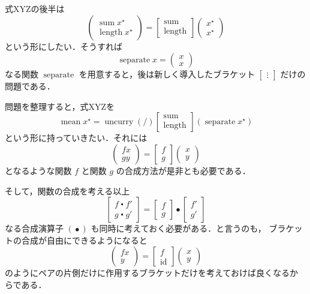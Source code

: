 \documentclass[a5paper,twoside,fleqn,draft]{jsbook}
\newcommand{\mSpecialFunc}[1]{#1}
\DeclareMathOperator{\mId}{\mSpecialFunc{id}}
\DeclareMathOperator{\mLength}{\mSpecialFunc{length}}
\DeclareMathOperator{\mMean}{\mSpecialFunc{mean}}
\DeclareMathOperator{\mSeparate}{\mSpecialFunc{separate}}
\DeclareMathOperator{\mSum}{\mSpecialFunc{sum}}
\DeclareMathOperator{\mUncurry}{\mSpecialFunc{uncurry}}
\DeclareMathOperator{\mComp}{\centerdot}
\DeclareMathOperator{\mCompCat}{\bullet}
\newcommand{\mPairWith}[2]{\begin{pmatrix}#1\\#2\end{pmatrix}}
\newcommand{\mList}[1]{{#1}^\mathrm{\star}}
\begin{document}
式XYZの後半は
\begin{equation}
  \mPairWith{\mSum\mList{x}}{\mLength\mList{x}}
  =\begin{bmatrix}
  \mSum\\
  \mLength
  \end{bmatrix}
  \mPairWith{\mList{x}}{\mList{x}}
\end{equation}
という形にしたい．そうすれば
\begin{equation}
  \mSeparate x
  =\mPairWith{x}{x}
\end{equation}
なる関数 $\mSeparate$ を用意すると，後は新しく導入したブラケット
$\begin{bmatrix}\vdots\end{bmatrix}$ だけの問題である．

問題を整理すると，式XYZを
\begin{equation}
  \mMean\mList{x}
  =\mUncurry(/)\begin{bmatrix}
    \mSum\\
    \mLength
  \end{bmatrix}
  (\mSeparate\mList{x})
\end{equation}
という形に持っていきたい．それには
\begin{equation}
  \mPairWith{fx}{gy}
  =\begin{bmatrix}f
  \\
  g
  \end{bmatrix}
  \mPairWith{x}{y}
\end{equation}
となるような関数 $f$ と関数 $g$ の合成方法が是非とも必要である．

そして，関数の合成を考える以上
\begin{equation}
  \begin{bmatrix}
    f\mComp f'\\
    g\mComp g'
  \end{bmatrix}
  =
  \begin{bmatrix}
    f\\
    g
  \end{bmatrix}
  \mCompCat
  \begin{bmatrix}
    f'\\
    g'
  \end{bmatrix}
\end{equation}
なる合成演算子 $(\mCompCat)$ も同時に考えておく必要がある．と言うのも，
ブラケットの合成が自由にできるようになると
\begin{equation}
  \begin{pmatrix}
    fx\\
    y
  \end{pmatrix}
  =
  \begin{bmatrix}
    f\\
    \mId
  \end{bmatrix}
  \begin{pmatrix}
    x\\
    y
  \end{pmatrix}
\end{equation}
のようにペアの片側だけに作用するブラケットだけを考えておけば良くなるか
らである．
\end{document}
